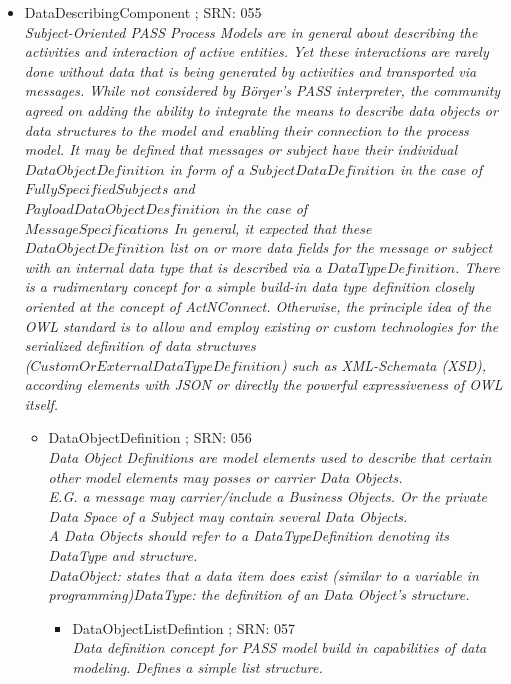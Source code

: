 \begin{itemize}
\begin{itemize}
			\item DataDescribingComponent ; SRN: 055 \\ \textit{Subject-Oriented PASS Process Models are in general about describing the activities and interaction of active entities. Yet these interactions are rarely done without data that is being generated by activities and transported via messages. While not considered by Börger's PASS interpreter, the community agreed on adding the ability to integrate the means to describe data objects or data structures to the model and enabling their connection to the process model. It may be defined that messages or subject have their individual $DataObjectDefinition$ in form of a $SubjectDataDefinition$ in the case of $FullySpecifiedSubject$s and \\ $PayloadDataObjectDesfinition$ in the case of \\ $MessageSpecifications$ In general, it expected that these \\ $DataObjectDefinition$ list on or more data fields for the message or subject with an internal data type that is described via a $DataTypeDefinition$. There is a rudimentary concept for a simple build-in data type definition closely oriented at the concept of ActNConnect. Otherwise, the principle idea of the OWL standard is to allow and employ existing or custom technologies for the serialized definition of data structures \\ ($CustomOrExternalDataTypeDefinition$) such as XML-Schemata (XSD), according elements with JSON or directly the powerful expressiveness of OWL itself.}
			\begin{itemize}
				\item DataObjectDefinition ; SRN: 056 \\ \textit{Data Object Definitions are model elements used to describe that certain other model elements may posses or carrier Data Objects.\\ E.G. a message may carrier/include a Business Objects. Or the private Data Space of a Subject may contain several Data Objects. \\A Data Objects should refer to a DataTypeDefinition denoting its DataType and structure.\\ DataObject: states that a data item does exist (similar to a variable in programming)DataType: the definition of an Data Object's structure.}
				\begin{itemize}
					\item DataObjectListDefintion ; SRN: 057 \\ \textit{Data definition concept for PASS model build in capabilities of data modeling. Defines a simple list structure.}

\end{itemize}
\end{itemize}
\end{itemize}
\end{itemize}
